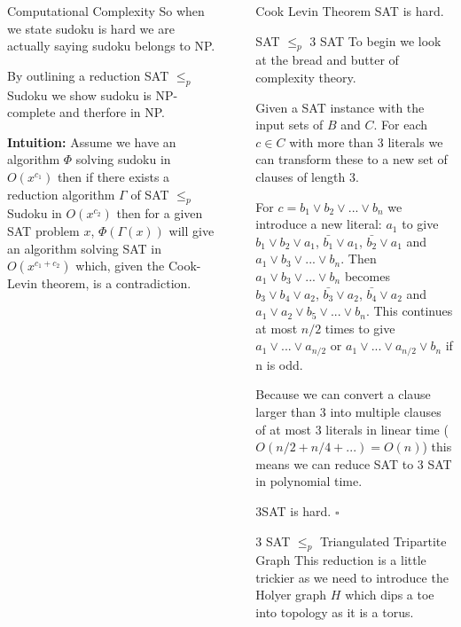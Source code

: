 \documentclass[final]{beamer}
\newlength{\sepwidth}
\newlength{\colwidth}
\newcounter{col}
\newcommand{\separatorcolumn}{\begin{column}{\sepwidth}\end{column}}
\begin{document}
\begin{frame}[t]
\begin{columns}[t]
\begin{column}{\colwidth}
\begin{block}{Computational Complexity}
So when we state sudoku is hard we are actually saying sudoku belongs to NP.

By outlining a reduction SAT $ \leq_p $ Sudoku we show sudoku is NP-complete and therfore in NP. 

\textbf{Intuition:} Assume we have an algorithm $\Phi$ solving sudoku in $O(x^{c_1})$ then if there exists a reduction algorithm $\Gamma$ of SAT $ \leq_p $ Sudoku in $O(x^{c_2})$  then for a given SAT problem $x$, $\Phi(\Gamma(x))$ will give an algorithm solving SAT in $O(x^{c_1+c_2})$ which, given the Cook-Levin theorem, is a contradiction. 

  \end{block}

\end{column}

\separatorcolumn

\begin{column}{\colwidth}  
\begin{alertblock}{Cook Levin Theorem}
SAT is hard.
  \end{alertblock}
  \begin{block}{SAT $\leq_p$ 3 SAT}
To begin we look at the bread and butter of complexity theory.

Given a SAT instance with the input sets of $B$ and $C$. For each $c \in C$ with more than 3 literals we can transform these to a new set of clauses of length 3. 

For $c = b_1 \lor b_2 \lor ... \lor b_n$ we introduce a new literal: $a_1$ to give $b_1 \lor b_2 \lor a_1$, $\bar{b_1} \lor a_1$, $\bar{b_2} \lor a_1$ and $a_1 \lor b_3 \lor ... \lor b_n$. Then $a_1 \lor b_3 \lor ... \lor b_n$ becomes $b_3 \lor b_4 \lor a_2$, $\bar{b_3} \lor a_2$, $\bar{b_4} \lor a_2$ and $a_1 \lor a_2 \lor b_5 \lor ... \lor b_n$. This continues at most $n/2$ times to give $a_1 \lor ... \lor a_{n/2}$ or $a_1 \lor ... \lor a_{n/2} \lor b_n$ if n is odd. 

Because we can convert a clause larger than 3 into multiple clauses of at most 3 literals in linear time ($O(n/2 + n/4 + ...) = O(n)$) this means we can reduce SAT to 3 SAT in polynomial time. 

3SAT is hard. $\square$

  \end{block}
  \begin{block}{3 SAT $\leq_p$ Triangulated Tripartite Graph \cite{doi:10.1137/0210054}}
This reduction is a little trickier as we need to introduce the Holyer graph $H$ which dips a toe into topology as it is a torus.


\end{block}
\end{column}
\end{columns}
\end{frame}
\end{document}
